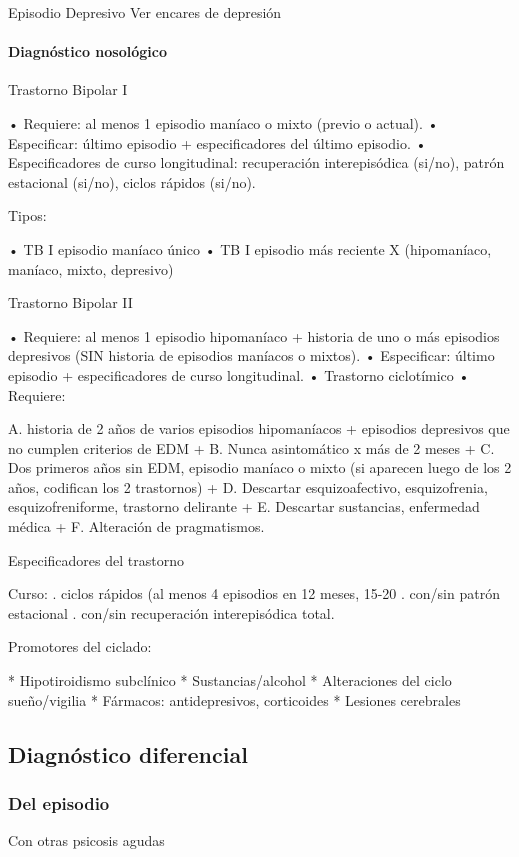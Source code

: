 Episodio Depresivo Ver encares de depresión

\paragraph{Diagnóstico nosológico}

Trastorno Bipolar I

• Requiere: al menos 1 episodio maníaco o mixto (previo o actual).
• Especificar: último episodio + especificadores del último episodio.
• Especificadores de curso longitudinal: recuperación interepisódica (si/no), patrón estacional (si/no), ciclos rápidos (si/no).

Tipos:

• TB I episodio maníaco único
• TB I episodio más reciente X (hipomaníaco, maníaco, mixto, depresivo)

Trastorno Bipolar II

• Requiere: al menos 1 episodio hipomaníaco + historia de uno o más episodios depresivos (SIN historia de episodios maníacos o mixtos).
• Especificar: último episodio + especificadores de curso longitudinal.
• Trastorno ciclotímico
• Requiere:

A. historia de 2 años de varios episodios hipomaníacos + episodios depresivos que no cumplen criterios de EDM +
B. Nunca asintomático x más de 2 meses +
C. Dos primeros años sin EDM, episodio maníaco o mixto (si aparecen luego de los 2 años, codifican los 2 trastornos) +
D. Descartar esquizoafectivo, esquizofrenia, esquizofreniforme, trastorno delirante +
E. Descartar sustancias, enfermedad médica +
F. Alteración de pragmatismos.

Especificadores del trastorno

Curso:
. ciclos rápidos (al menos 4 episodios en 12 meses, 15-20%
. con/sin patrón estacional
. con/sin recuperación interepisódica total.

Promotores del ciclado:

* Hipotiroidismo subclínico
* Sustancias/alcohol
* Alteraciones del ciclo sueño/vigilia
* Fármacos: antidepresivos, corticoides
* Lesiones cerebrales

\subsection*{Diagnóstico diferencial}
\subsubsection*{Del episodio}
Con otras psicosis agudas

